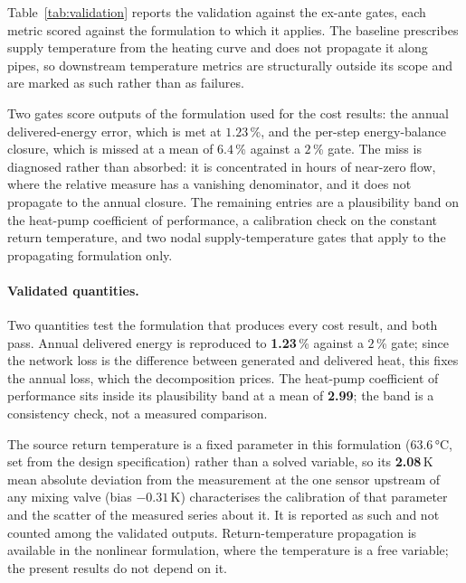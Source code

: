 
Table~\ref{tab:validation} reports the validation against the ex-ante gates, each metric
scored against the formulation to which it applies. The baseline prescribes supply
temperature from the heating curve and does not propagate it along pipes, so downstream
temperature metrics are structurally outside its scope and are marked as such rather than as
failures.

Two gates score outputs of the formulation used for the cost results: the annual
delivered-energy error, which is met at $1.23$\,\%, and the per-step energy-balance closure,
which is missed at a mean of $6.4$\,\% against a $2$\,\% gate. The miss is diagnosed rather
than absorbed: it is concentrated in hours of near-zero flow, where the relative measure has a
vanishing denominator, and it does not propagate to the annual closure. The remaining entries
are a plausibility band on the heat-pump coefficient of performance, a calibration check on the
constant return temperature, and two nodal supply-temperature gates that apply to the
propagating formulation only.

\paragraph{Validated quantities.}
Two quantities test the formulation that produces every cost result, and both pass. Annual
delivered energy is reproduced to \textbf{1.23}\,\% against a $2$\,\% gate; since the network
loss is the difference between generated and delivered heat, this fixes the annual loss, which
the decomposition prices. The heat-pump coefficient of performance sits inside its plausibility
band at a mean of \textbf{2.99}; the band is a consistency check, not a measured comparison.

The source return temperature is a fixed parameter in this formulation
($63.6$\,°C, set from the design specification) rather than a solved variable, so its
\textbf{2.08}\,K mean absolute deviation from the measurement at the one sensor upstream of any
mixing valve (bias $-0.31$\,K) characterises the calibration of that parameter and the scatter
of the measured series about it. It is reported as such and not counted among the validated
outputs. Return-temperature propagation is available in the nonlinear formulation, where the
temperature is a free variable; the present results do not depend on it.


